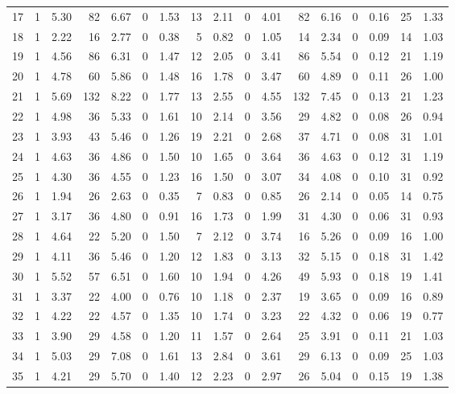 \begin{table}
\begin{tabular}{lrrrrrrrrrrrrrrrr}
17 & 1 & 5.30 & 82 & 6.67 & 0 & 1.53 & 13 & 2.11 & 0 & 4.01 & 82 & 6.16 & 0 & 0.16 & 25 & 1.33 \\
18 & 1 & 2.22 & 16 & 2.77 & 0 & 0.38 & 5 & 0.82 & 0 & 1.05 & 14 & 2.34 & 0 & 0.09 & 14 & 1.03 \\
19 & 1 & 4.56 & 86 & 6.31 & 0 & 1.47 & 12 & 2.05 & 0 & 3.41 & 86 & 5.54 & 0 & 0.12 & 21 & 1.19 \\
20 & 1 & 4.78 & 60 & 5.86 & 0 & 1.48 & 16 & 1.78 & 0 & 3.47 & 60 & 4.89 & 0 & 0.11 & 26 & 1.00 \\
21 & 1 & 5.69 & 132 & 8.22 & 0 & 1.77 & 13 & 2.55 & 0 & 4.55 & 132 & 7.45 & 0 & 0.13 & 21 & 1.23 \\
22 & 1 & 4.98 & 36 & 5.33 & 0 & 1.61 & 10 & 2.14 & 0 & 3.56 & 29 & 4.82 & 0 & 0.08 & 26 & 0.94 \\
23 & 1 & 3.93 & 43 & 5.46 & 0 & 1.26 & 19 & 2.21 & 0 & 2.68 & 37 & 4.71 & 0 & 0.08 & 31 & 1.01 \\
24 & 1 & 4.63 & 36 & 4.86 & 0 & 1.50 & 10 & 1.65 & 0 & 3.64 & 36 & 4.63 & 0 & 0.12 & 31 & 1.19 \\
25 & 1 & 4.30 & 36 & 4.55 & 0 & 1.23 & 16 & 1.50 & 0 & 3.07 & 34 & 4.08 & 0 & 0.10 & 31 & 0.92 \\
26 & 1 & 1.94 & 26 & 2.63 & 0 & 0.35 & 7 & 0.83 & 0 & 0.85 & 26 & 2.14 & 0 & 0.05 & 14 & 0.75 \\
27 & 1 & 3.17 & 36 & 4.80 & 0 & 0.91 & 16 & 1.73 & 0 & 1.99 & 31 & 4.30 & 0 & 0.06 & 31 & 0.93 \\
28 & 1 & 4.64 & 22 & 5.20 & 0 & 1.50 & 7 & 2.12 & 0 & 3.74 & 16 & 5.26 & 0 & 0.09 & 16 & 1.00 \\
29 & 1 & 4.11 & 36 & 5.46 & 0 & 1.20 & 12 & 1.83 & 0 & 3.13 & 32 & 5.15 & 0 & 0.18 & 31 & 1.42 \\
30 & 1 & 5.52 & 57 & 6.51 & 0 & 1.60 & 10 & 1.94 & 0 & 4.26 & 49 & 5.93 & 0 & 0.18 & 19 & 1.41 \\
31 & 1 & 3.37 & 22 & 4.00 & 0 & 0.76 & 10 & 1.18 & 0 & 2.37 & 19 & 3.65 & 0 & 0.09 & 16 & 0.89 \\
32 & 1 & 4.22 & 22 & 4.57 & 0 & 1.35 & 10 & 1.74 & 0 & 3.23 & 22 & 4.32 & 0 & 0.06 & 19 & 0.77 \\
33 & 1 & 3.90 & 29 & 4.58 & 0 & 1.20 & 11 & 1.57 & 0 & 2.64 & 25 & 3.91 & 0 & 0.11 & 21 & 1.03 \\
34 & 1 & 5.03 & 29 & 7.08 & 0 & 1.61 & 13 & 2.84 & 0 & 3.61 & 29 & 6.13 & 0 & 0.09 & 25 & 1.03 \\
35 & 1 & 4.21 & 29 & 5.70 & 0 & 1.40 & 12 & 2.23 & 0 & 2.97 & 26 & 5.04 & 0 & 0.15 & 19 & 1.38 \\

\end{tabular}
\end{table}
